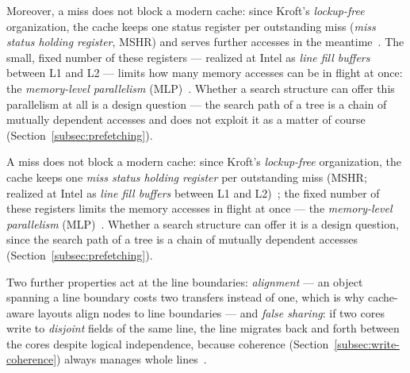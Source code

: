 \begin{nurlang}
Moreover, a miss does not block a modern cache: since Kroft's \emph{lockup-free} organization, the
cache keeps one status register per outstanding miss (\emph{miss status holding register}, MSHR)
and serves further accesses in the meantime~\cite{kroft1981lockupfree}. The small, fixed number of
these registers --- realized at Intel as \emph{line fill buffers} between L1 and L2 --- limits how
many memory accesses can be in flight at once: the \emph{memory-level parallelism}
(MLP)~\cite{hennessy2019architecture,intel_optimization}. Whether a search structure can offer this
parallelism at all is a design question --- the search path of a tree is a chain of mutually
dependent accesses and does not exploit it as a matter of course
(Section~\ref{subsec:prefetching}).
\end{nurlang}
\begin{nurkurz}
A miss does not block a modern cache: since Kroft's \emph{lockup-free} organization, the cache keeps one
\emph{miss status holding register} per outstanding miss (MSHR\@; realized at Intel as \emph{line fill
buffers} between L1 and L2)~\cite{kroft1981lockupfree}; the fixed number of these registers limits the memory
accesses in flight at once --- the \emph{memory-level parallelism}
(MLP)~\cite{hennessy2019architecture,intel_optimization}. Whether a search structure can offer it is a design
question, since the search path of a tree is a chain of mutually dependent accesses
(Section~\ref{subsec:prefetching}).
\end{nurkurz}

Two further properties act at the line boundaries: \emph{alignment} --- an object spanning a line
boundary costs two transfers instead of one, which is why cache-aware layouts align nodes to line
boundaries --- and \emph{false sharing}: if two cores write to \emph{disjoint} fields of the same
line, the line migrates back and forth between the cores despite logical independence, because
coherence (Section~\ref{subsec:write-coherence}) always manages whole
lines~\cite{drepper2007memory,intel_optimization}.

